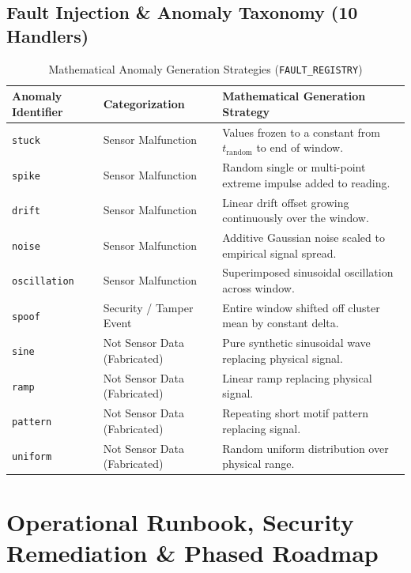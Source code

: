 \documentclass[10pt,a4paper]{report}
\begin{document}
\section{Fault Injection \& Anomaly Taxonomy (10 Handlers)}
\begin{table}[htbp]
\centering
\small
\caption{Mathematical Anomaly Generation Strategies (\texttt{FAULT\_REGISTRY})}
\label{tab:fault_taxonomy}
\begin{tabularx}{\textwidth}{llX}
\toprule
\textbf{Anomaly Identifier} & \textbf{Categorization} & \textbf{Mathematical Generation Strategy} \\
\midrule
\texttt{stuck} & Sensor Malfunction & Values frozen to a constant from $t_{\text{random}}$ to end of window. \\
\texttt{spike} & Sensor Malfunction & Random single or multi-point extreme impulse added to reading. \\
\texttt{drift} & Sensor Malfunction & Linear drift offset growing continuously over the window. \\
\texttt{noise} & Sensor Malfunction & Additive Gaussian noise scaled to empirical signal spread. \\
\texttt{oscillation} & Sensor Malfunction & Superimposed sinusoidal oscillation across window. \\
\texttt{spoof} & Security / Tamper Event & Entire window shifted off cluster mean by constant delta. \\
\texttt{sine} & Not Sensor Data (Fabricated) & Pure synthetic sinusoidal wave replacing physical signal. \\
\texttt{ramp} & Not Sensor Data (Fabricated) & Linear ramp replacing physical signal. \\
\texttt{pattern} & Not Sensor Data (Fabricated) & Repeating short motif pattern replacing signal. \\
\texttt{uniform} & Not Sensor Data (Fabricated) & Random uniform distribution over physical range. \\
\bottomrule
\end{tabularx}
\end{table}

\chapter{Operational Runbook, Security Remediation \& Phased Roadmap}
\end{document}
